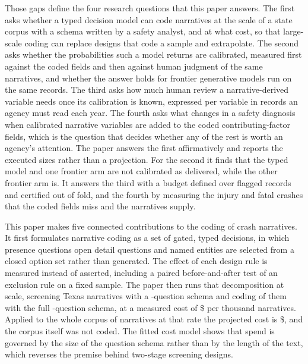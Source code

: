 Those gaps define the four research questions that this paper answers. The first asks whether
a typed decision model can code narratives at the scale of a state corpus with a schema written
by a safety analyst, and at what cost, so that large-scale coding can replace designs that code
a sample and extrapolate. The second asks whether the probabilities such a model returns are
calibrated, measured first against the coded fields and then against human judgment of the same
narratives, and whether the answer holds for frontier generative models run on the same
records. The third asks how much human review a narrative-derived variable needs once its
calibration is known, expressed per variable in records an agency must read each year. The
fourth asks what changes in a safety diagnosis when calibrated narrative variables are added to
the coded contributing-factor fields, which is the question that decides whether any of the
rest is worth an agency's attention. The paper answers the first affirmatively and reports the
executed sizes rather than a projection. For the second it finds that the typed model and one
frontier arm are not calibrated as delivered, while the other frontier arm is. It answers the
third with a budget defined over flagged records and certified out of fold, and the fourth by
measuring the injury and fatal crashes that the coded fields miss and the narratives supply.

This paper makes five connected contributions to the coding of crash narratives. It first
formulates narrative coding as a set of gated, typed decisions, in which presence questions
open detail questions and named entities are selected from a closed option set rather than
generated. The effect of each design rule is measured instead of asserted, including a paired
before-and-after test of an exclusion rule on a fixed sample. The paper then runs that
decomposition at scale, screening \StageOneCoded{} Texas narratives with a
\NLeanQuestions{}-question schema and coding \NstageTwo{} of them with the full
\NQuestions{}-question schema, at a measured cost of \$\CostPerThousand{} per thousand
narratives. Applied to the whole corpus of \Ncorpus{} narratives at that rate the projected
cost is \$\CostWholeCorpus{}, and the corpus itself was not coded. The fitted cost model shows
that spend is governed by the size of the question schema rather than by the length of the
text, which reverses the premise behind two-stage screening designs.

